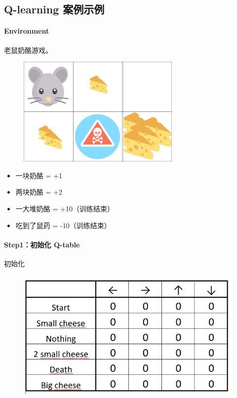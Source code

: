 \documentclass[UTF8,a4paper,12pt]{ctexbook}
\begin{document}
	
		\subsection{Q-learning 案例示例}
		
			\paragraph{Environment}
				老鼠奶酪游戏。
				
				\begin{figure}[H]
					\centering
					\includegraphics[width=.4\linewidth]{qExample}
				\end{figure}
			
				\begin{itemize}
					\item 一块奶酪 = +1
					\item 两块奶酪 = +2
					\item 一大堆奶酪 = +10（训练结束）
					\item 吃到了鼠药 = -10（训练结束）
				\end{itemize}
			
			
			\paragraph{Step1：初始化 Q-table}
				初始化
				
				\begin{figure}[H]
					\centering
					\includegraphics[width=.7\linewidth]{qExample01}
				\end{figure}
			
\end{document}
